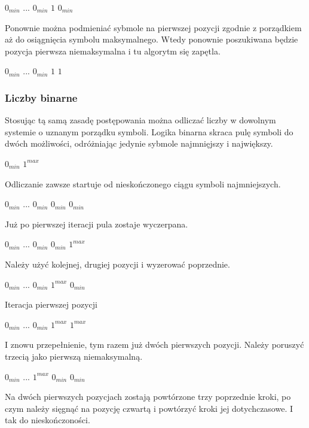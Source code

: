 \documentclass[a4paper,12pt]{article}
\begin{document}
$0_{min}$ ... $0_{min}$ $1$ $0_{min}$

Ponownie można podmieniać sybmole na pierwszej pozycji zgodnie z porządkiem aż do osiągnięcia symbolu maksymalnego. Wtedy ponownie poszukiwana będzie pozycja pierwsza niemaksymalna i tu algorytm się zapętla.

$0_{min}$ ... $0_{min}$ $1$ $1$

\subsubsection{Liczby binarne}

Stosując tą samą zasadę postępowania można odliczać liczby w dowolnym systemie o uznanym porządku symboli. Logika binarna skraca pulę symboli do dwóch możliwości, odróżniając jedynie sybmole najmnięjszy i największy.

$0_{min}$ $1^{max}$

Odliczanie zawsze startuje od nieskończonego ciągu symboli najmniejszych.

$0_{min}$ ... $0_{min}$ $0_{min}$ $0_{min}$

Już po pierwszej iteracji pula zostaje wyczerpana.

$0_{min}$ ... $0_{min}$ $0_{min}$ $1^{max}$

Należy użyć kolejnej, drugiej pozycji i wyzerować poprzednie.

$0_{min}$ ... $0_{min}$ $1^{max}$ $0_{min}$

Iteracja pierwszej pozycji

$0_{min}$ ... $0_{min}$ $1^{max}$ $1^{max}$

I znowu przepełnienie, tym razem już dwóch pierwszych pozycji. Należy poruszyć trzecią jako pierwszą niemaksymalną.

$0_{min}$ ... $1^{max}$ $0_{min}$ $0_{min}$

Na dwóch pierwszych pozycjach zostają powtórzone trzy poprzednie kroki, po czym należy sięgnąć na pozycję czwartą i powtórzyć kroki jej dotychczasowe. I tak do nieskończoności.
\end{document}
